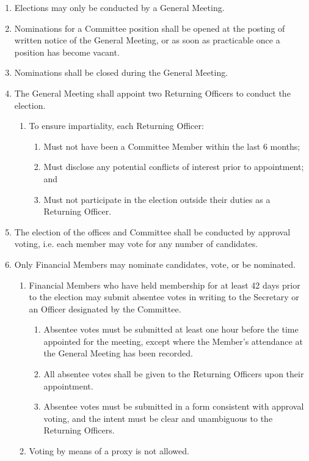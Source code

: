 \documentclass[a4paper]{article}
\begin{document}
\begin{enumerate}
    \item Elections may only be conducted by a General Meeting.
    \item Nominations for a Committee position shall be opened at the posting of written notice of the General Meeting, or as soon as practicable once a position has become vacant.
    \item Nominations shall be closed during the General Meeting.
    \item The General Meeting shall appoint two Returning Officers to conduct the election.
          \begin{enumerate}
              \item To ensure impartiality, each Returning Officer:
                    \begin{enumerate}
                        \item Must not have been a Committee Member within the last 6 months;
                        \item Must disclose any potential conflicts of interest prior to appointment; and
                        \item Must not participate in the election outside their duties as a Returning Officer.
                    \end{enumerate}
          \end{enumerate}
    \item The election of the offices and Committee shall be conducted by approval voting, i.e. each member may vote for any number of candidates.
    \item Only Financial Members may nominate candidates, vote, or be nominated.
          \begin{enumerate}
              \item Financial Members who have held membership for at least 42 days prior to the election may submit absentee votes in writing to the Secretary or an Officer designated by the Committee.
                    \begin{enumerate}
                        \item Absentee votes must be submitted at least one hour before the time appointed for the meeting, except where the Member’s attendance at the General Meeting has been recorded.
                        \item All absentee votes shall be given to the Returning Officers upon their appointment.
                        \item Absentee votes must be submitted in a form consistent with approval voting, and the intent must be clear and unambiguous to the Returning Officers.
                    \end{enumerate}
              \item Voting by means of a proxy is not allowed.
          \end{enumerate}
\end{enumerate}
\end{document}
